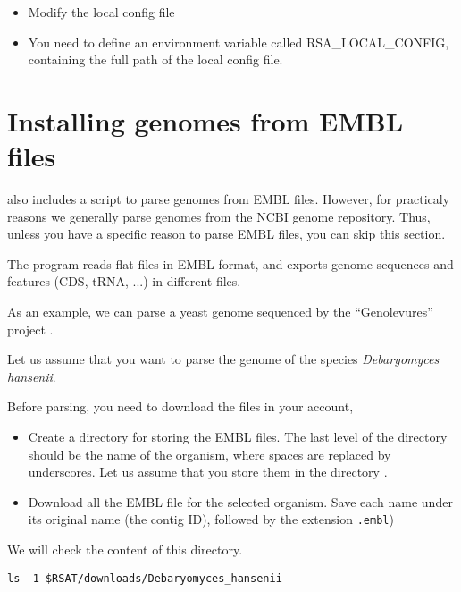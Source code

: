 \begin{itemize}
\item Modify the local config file

\item You need to define an environment variable called
  RSA\_LOCAL\_CONFIG, containing the full path of the local config
  file.

\end{itemize}


\chapter{Installing genomes from EMBL files}

\RSAT also includes a script  to parse genomes
from EMBL files. However, for practicaly reasons we generally parse
genomes from the NCBI genome repository. Thus, unless you have a
specific reason to parse EMBL files, you can skip this section.

The program  reads flat files in EMBL format,
and exports genome sequences and features (CDS, tRNA, ...) in
different files.

As an example, we can parse a yeast genome sequenced by the
``Genolevures'' project
.

Let us assume that you want to parse the genome of the species
\textit{Debaryomyces hansenii}.

Before parsing, you need to download the files in your account, 

\begin{itemize}
\item Create a directory for storing the EMBL files. The last level of
  the directory should be the name of the organism, where spaces are
  replaced by underscores. Let us assume that you store them in
  the directory .

\item Download all the EMBL file for the selected organism. Save each
  name under its original name (the contig ID), followed by the
  extension \texttt{.embl})

\end{itemize}

We will check the content of this directory.

\begin{footnotesize}
\begin{verbatim}
ls -1 $RSAT/downloads/Debaryomyces_hansenii
\end{verbatim}
\end{footnotesize}

